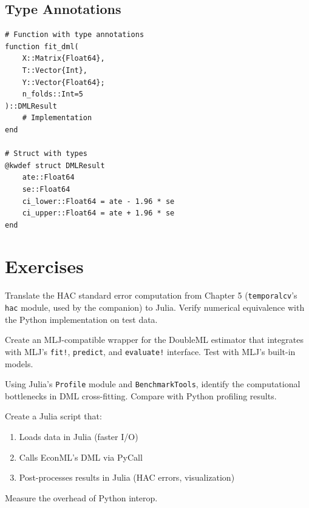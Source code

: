 \subsection{Type Annotations}

\begin{verbatim}
# Function with type annotations
function fit_dml(
    X::Matrix{Float64},
    T::Vector{Int},
    Y::Vector{Float64};
    n_folds::Int=5
)::DMLResult
    # Implementation
end

# Struct with types
@kwdef struct DMLResult
    ate::Float64
    se::Float64
    ci_lower::Float64 = ate - 1.96 * se
    ci_upper::Float64 = ate + 1.96 * se
end
\end{verbatim}


\section{Exercises}\label{sec:app_exercises}

\begin{exercise}
Translate the HAC standard error computation from Chapter 5 (\texttt{temporalcv}'s \texttt{hac} module, used by the companion) to Julia. Verify numerical equivalence with the Python implementation on test data.
\end{exercise}

\begin{exercise}
Create an MLJ-compatible wrapper for the DoubleML estimator that integrates with MLJ's \texttt{fit!}, \texttt{predict}, and \texttt{evaluate!} interface. Test with MLJ's built-in models.
\end{exercise}

\begin{exercise}
Using Julia's \texttt{Profile} module and \texttt{BenchmarkTools}, identify the computational bottlenecks in DML cross-fitting. Compare with Python profiling results.
\end{exercise}

\begin{exercise}
Create a Julia script that:
\begin{enumerate}
    \item Loads data in Julia (faster I/O)
    \item Calls EconML's DML via PyCall
    \item Post-processes results in Julia (HAC errors, visualization)
\end{enumerate}
Measure the overhead of Python interop.
\end{exercise}



